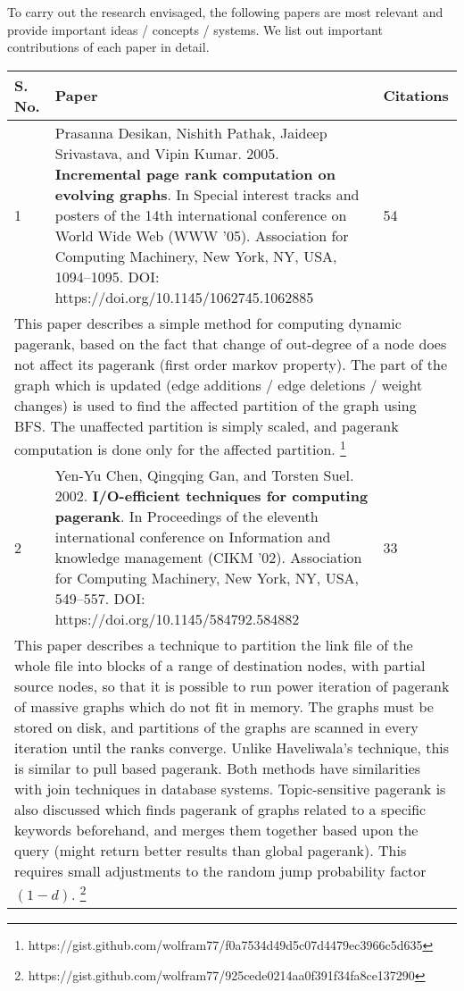 To carry out the research envisaged, the following papers are most relevant and provide important ideas / concepts / systems. We list out important contributions of each paper in detail.




\begin{longtable}[!hbtp]{|p{1cm}|p{11cm}|p{2cm}|}
  \hline
  \textbf{S. No.} &
  \textbf{Paper} &
  \textbf{Citations} \\ \hline
  \endfirsthead
  \endhead
  \endfoot
  \endlastfoot

  1 &
  Prasanna Desikan, Nishith Pathak, Jaideep Srivastava, and Vipin Kumar. 2005. \textbf{Incremental page rank computation on evolving graphs}. In Special interest tracks and posters of the 14th international conference on World Wide Web (WWW '05). Association for Computing Machinery, New York, NY, USA, 1094–1095.\linebreak
  DOI: https://doi.org/10.1145/1062745.1062885 &
  54 \\ \hline
  \multicolumn{3}{|p{14cm}|}{This paper describes a simple method for computing dynamic pagerank, based on the fact that change of out-degree of a node does not affect its pagerank (first order markov property). The part of the graph which is updated (edge additions / edge deletions / weight changes) is used to find the affected partition of the graph using BFS. The unaffected partition is simply scaled, and pagerank computation is done only for the affected partition. \footnote{https://gist.github.com/wolfram77/f0a7534d49d5c07d4479ec3966c5d635}} \\ \hline

  2 &
  Yen-Yu Chen, Qingqing Gan, and Torsten Suel. 2002. \textbf{I/O-efficient techniques for computing pagerank}. In Proceedings of the eleventh international conference on Information and knowledge management (CIKM '02). Association for Computing Machinery, New York, NY, USA, 549–557.\linebreak
  DOI: https://doi.org/10.1145/584792.584882 &
  33 \\ \hline
  \multicolumn{3}{|p{14cm}|}{This paper describes a technique to partition the link file of the whole file into blocks of a range of destination nodes, with partial source nodes, so that it is possible to run power iteration of pagerank of massive graphs which do not fit in memory. The graphs must be stored on disk, and partitions of the graphs are scanned in every iteration until the ranks converge. Unlike Haveliwala's technique, this is similar to pull based pagerank. Both methods have similarities with join techniques in database systems. Topic-sensitive pagerank is also discussed which finds pagerank of graphs related to a specific keywords beforehand, and merges them together based upon the query (might return better results than global pagerank). This requires small adjustments to the random jump probability factor $(1-d)$. \footnote{https://gist.github.com/wolfram77/925cede0214aa0f391f34fa8ce137290}} \\ \hline


\end{longtable}
